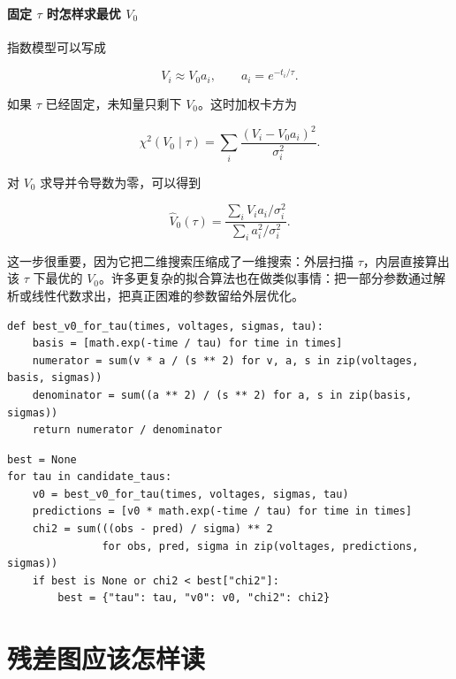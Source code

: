 \paragraph{固定 \texorpdfstring{$\tau$}{tau} 时怎样求最优 \texorpdfstring{$V_0$}{V0}}

指数模型可以写成

\[
V_i \approx V_0 a_i,
\qquad
a_i = e^{-t_i/\tau}.
\]

如果 $\tau$ 已经固定，未知量只剩下 $V_0$。这时加权卡方为

\[
\chi^2(V_0\mid\tau)
= \sum_i \frac{(V_i - V_0 a_i)^2}{\sigma_i^2}.
\]

对 $V_0$ 求导并令导数为零，可以得到

\[
\hat{V}_0(\tau)
=
\frac{\sum_i V_i a_i/\sigma_i^2}
{\sum_i a_i^2/\sigma_i^2}.
\]

这一步很重要，因为它把二维搜索压缩成了一维搜索：外层扫描 $\tau$，内层直接算出该 $\tau$ 下最优的 $V_0$。许多更复杂的拟合算法也在做类似事情：把一部分参数通过解析或线性代数求出，把真正困难的参数留给外层优化。

\begin{examplebox}
\begin{lstlisting}[style=pythonstyle]
def best_v0_for_tau(times, voltages, sigmas, tau):
    basis = [math.exp(-time / tau) for time in times]
    numerator = sum(v * a / (s ** 2) for v, a, s in zip(voltages, basis, sigmas))
    denominator = sum((a ** 2) / (s ** 2) for a, s in zip(basis, sigmas))
    return numerator / denominator
\end{lstlisting}
\end{examplebox}

\begin{examplebox}[一维参数搜索的最小形状]
\begin{lstlisting}[style=pythonstyle]
best = None
for tau in candidate_taus:
    v0 = best_v0_for_tau(times, voltages, sigmas, tau)
    predictions = [v0 * math.exp(-time / tau) for time in times]
    chi2 = sum(((obs - pred) / sigma) ** 2
               for obs, pred, sigma in zip(voltages, predictions, sigmas))
    if best is None or chi2 < best["chi2"]:
        best = {"tau": tau, "v0": v0, "chi2": chi2}
\end{lstlisting}
\end{examplebox}

\section{残差图应该怎样读}

